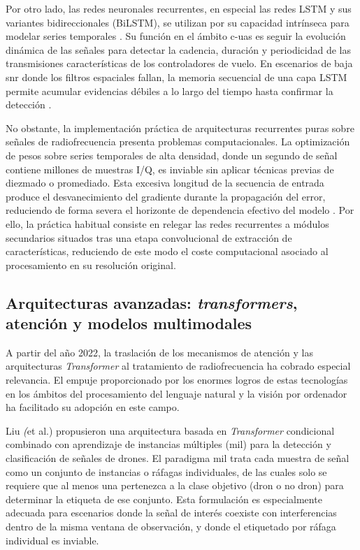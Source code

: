 Por otro lado, las redes neuronales recurrentes, en especial las redes LSTM y sus variantes bidireccionales (BiLSTM), se utilizan por su capacidad intrínseca para modelar series temporales \cite{lacy_machine_2024}. Su función en el ámbito \gls{c-uas} es seguir la evolución dinámica de las señales para detectar la cadencia, duración y periodicidad de las transmisiones características de los controladores de vuelo. En escenarios de baja \gls{snr} donde los filtros espaciales fallan, la memoria secuencial de una capa LSTM permite acumular evidencias débiles a lo largo del tiempo hasta confirmar la detección \cite{rout_novel_2025}.

No obstante, la implementación práctica de arquitecturas recurrentes puras sobre señales de radiofrecuencia presenta problemas computacionales. La optimización de pesos sobre series temporales de alta densidad, donde un segundo de señal contiene millones de muestras I/Q, es inviable sin aplicar técnicas previas de diezmado o promediado. Esta excesiva longitud de la secuencia de entrada produce el desvanecimiento del gradiente durante la propagación del error, reduciendo de forma severa el horizonte de dependencia efectivo del modelo \cite{pascanu_difficulty_2013}. Por ello, la práctica habitual consiste en relegar las redes recurrentes a módulos secundarios situados tras una etapa convolucional de extracción de características, reduciendo de este modo el coste computacional asociado al procesamiento en su resolución original.

\subsection{Arquitecturas avanzadas: \textit{transformers}, atención y modelos multimodales}
\label{subsec:arquitecturas_avanzadas}

A partir del año 2022, la traslación de los mecanismos de atención y las arquitecturas \textit{Transformer} al tratamiento de radiofrecuencia ha cobrado especial relevancia. El empuje proporcionado por los enormes logros de estas tecnologías en los ámbitos del procesamiento del lenguaje natural y la visión por ordenador ha facilitado su adopción en este campo.

Liu \textit(et al.) \cite{liu_transformer-based_2025} propusieron una arquitectura basada en \textit{Transformer} condicional combinado con aprendizaje de instancias múltiples (\gls{mil}) para la detección y clasificación de señales de drones. El paradigma \gls{mil} trata cada muestra de señal como un conjunto de instancias o ráfagas individuales, de las cuales solo se requiere que al menos una pertenezca a la clase objetivo (dron o no dron) para determinar la etiqueta de ese conjunto. Esta formulación es especialmente adecuada para escenarios donde la señal de interés coexiste con interferencias dentro de la misma ventana de observación, y donde el etiquetado por ráfaga individual es inviable.

